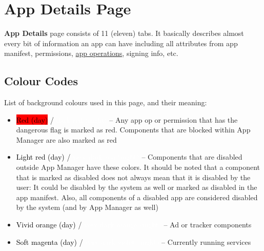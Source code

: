 \section{App Details Page}\label{sec:app-details-page} %
\textbf{App Details} page consists of 11 (eleven) tabs. It basically describes almost every bit of information an app
can have including all attributes from app manifest, permissions, \hyperref[ch:app-ops]{app operations}, signing info,
etc.

\subsection{Colour Codes}\label{subsec:app-details-colour-codes} %
List of background colours used in this page, and their meaning:
\begin{itemize}
    \item \colorbox{red}{\textcolor{black}{Red (day)}} / \colorbox{AMDarkRed}{\textcolor{white}{dark red (night)}}
    -- Any app op or permission that has the dangerous flag is marked as red. Components that are blocked within App
    Manager are also marked as red

    \item \colorbox{AMLightRed}{\textcolor{black}{Light red (day)}} / \colorbox{AMVeryDarkRed}{\textcolor{white}{very
    dark red (night)}} -- Components that are disabled outside App Manager have these colors. It should be noted that a
    component that is marked as disabled does not always mean that it is disabled by the user: It could be disabled by
    the system as well or marked as disabled in the app manifest. Also, all components of a disabled app are considered
    disabled by the system (and by App Manager as well)

    \item \colorbox{AMVividOrange}{\textcolor{black}{Vivid orange (day)}} / \colorbox{AMVeryDarkOrange}{
        \textcolor{white}{very dark orange (night)}} -- Ad or tracker components

    \item \colorbox{AMSoftMagenta}{\textcolor{black}{Soft magenta (day)}} / \colorbox{AMVeryDarkViolet}{
        \textcolor{white}{very dark violet (night)}} -- Currently running services
\end{itemize}

